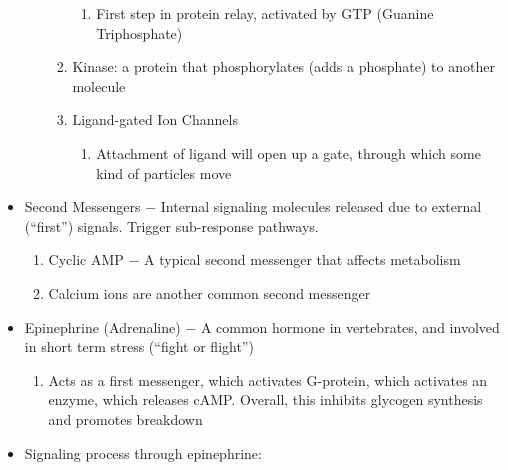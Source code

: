 \documentclass[12pt]{article}
\begin{document}
\begin{itemize}
\begin{enumerate}
\begin{enumerate}
\begin{enumerate}
              \item First step in protein relay, activated by GTP (Guanine Triphosphate)

            \end{enumerate}

          \item Kinase: a protein that phosphorylates (adds a phosphate) to another molecule

          \item Ligand-gated Ion Channels

            \begin{enumerate}

              \item Attachment of ligand will open up a gate, through which some kind of particles move

            \end{enumerate}

        \end{enumerate}

    \end{enumerate}

  \item Second Messengers $-$ Internal signaling molecules released due to external (``first'') signals. Trigger sub-response pathways.

    \begin{enumerate}

      \item Cyclic AMP $-$ A typical second messenger that affects metabolism

      \item Calcium ions are another common second messenger

    \end{enumerate}

  \item Epinephrine (Adrenaline) $-$ A common hormone in vertebrates, and involved in short term stress (``fight or flight'')

    \begin{enumerate}

      \item Acts as a first messenger, which activates G-protein, which activates an enzyme, which releases cAMP. Overall, this inhibits glycogen synthesis and promotes breakdown

    \end{enumerate}
    
  \item Signaling process through epinephrine:


\end{itemize}
\end{document}
